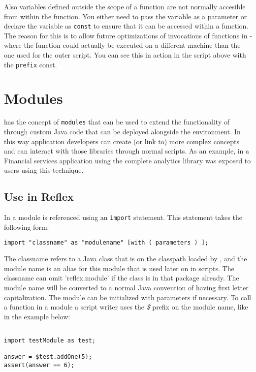 Also variables defined outside the scope of a function are not normally accesible from within the function. You either need to pass the variable as a parameter or declare the variable as \Verb+const+ to ensure that it can be accessed within a function. The reason for this is to allow future optimizations of invocations of functions in \Reflex - where the function could actually be executed on a different machine than the one used for the outer script. You can see this in action in the script above with the \verb+prefix+ const.

\chapter{Modules}
\Reflex has the concept of \Verb+modules+ that can be used to extend the functionality of \Reflex through custom Java code that can be deployed alongside the environment. In this way application developers can create (or link to) more complex concepts and can interact with those libraries through normal \Reflex scripts. As an example, in a Financial services application using \Reflex the complete analytics library was exposed to \Reflex users using this technique.

\section{Use in Reflex}
In \Reflex a module is referenced using an \Verb+import+ statement. This statement takes the following form:
\begin{Verbatim}
import "classname" as "modulename" [with ( parameters ) ];
\end{Verbatim}

The classname refers to a Java class that is on the classpath loaded by \Reflex, and the module name is an alias for this module that is used later on in scripts. The classname can omit 'reflex.module' if the class is in that package already. The module name will be converted to a normal Java convention of having first letter capitalization. The module can be initialized with parameters if necessary. To call a function in a module a script writer uses the \emph{\$} prefix on the module name, like in the example below:

\begin{lstlisting}[caption={Module example}]

import testModule as test;

answer = $test.addOne(5);
assert(answer == 6);
\end{lstlisting}

